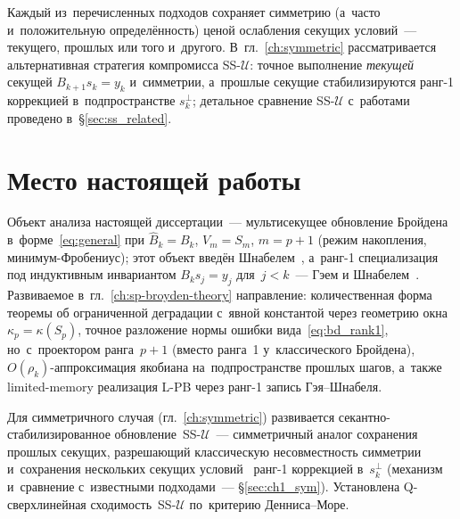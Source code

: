 Каждый из~перечисленных подходов сохраняет симметрию (а~часто
и~положительную определённость) ценой ослабления секущих условий~---
текущего, прошлых или того и~другого. В~гл.~\ref{ch:symmetric}
рассматривается альтернативная стратегия компромисса
SS-$\mathcal{U}$: точное выполнение \emph{текущей} секущей
$B_{k+1}s_k = y_k$ и~симметрии, а~прошлые секущие стабилизируются
ранг-1 коррекцией в~подпространстве $s_k^\perp$; детальное сравнение
SS-$\mathcal{U}$ с~работами~\cite{gratton2015,boutet2020,boutet2021,boutet2022,scieur2021}
проведено в~\S\ref{sec:ss_related}.


\section{Место настоящей работы}\label{sec:ch1_place}

Объект анализа настоящей диссертации~--- мультисекущее обновление
Бройдена в~форме~\eqref{eq:general} при $\widehat{B}_k = B_k$, $V_m = S_m$,
$m = p+1$ (режим накопления, минимум-Фробениус); этот объект введён
Шнабелем~\cite{schnabel1983}, а~ранг-1 специализация под индуктивным
инвариантом $B_k s_j = y_j$ для~$j<k$~--- Гэем и
Шнабелем~\cite{gay_schnabel1978}. Развиваемое в~гл.~\ref{ch:sp-broyden-theory}
направление: количественная форма теоремы об ограниченной деградации
с~явной константой через геометрию окна $\kappa_p = \kappa(S_p)$,
точное разложение нормы ошибки вида~\eqref{eq:bd_rank1}, но~с~проектором
ранга~$p{+}1$ (вместо ранга~1 у~классического Бройдена), $O(\rho_k)$-аппроксимация
якобиана на~подпространстве прошлых шагов, а~также limited-memory
реализация L-PB через ранг-1 запись Гэя--Шнабеля.

Для симметричного случая (гл.~\ref{ch:symmetric}) развивается
секантно-стабилизированное обновление~SS-$\mathcal{U}$~--- симметричный
аналог сохранения прошлых секущих, разрешающий классическую
несовместность симметрии и~сохранения нескольких секущих
условий~\cite{schnabel1983} ранг-1 коррекцией в~$s_k^\perp$ (механизм
и~сравнение с~известными подходами~--- \S\ref{sec:ch1_sym}).
Установлена Q-сверхлинейная сходимость~SS-$\mathcal{U}$ по~критерию
Денниса--Море.

